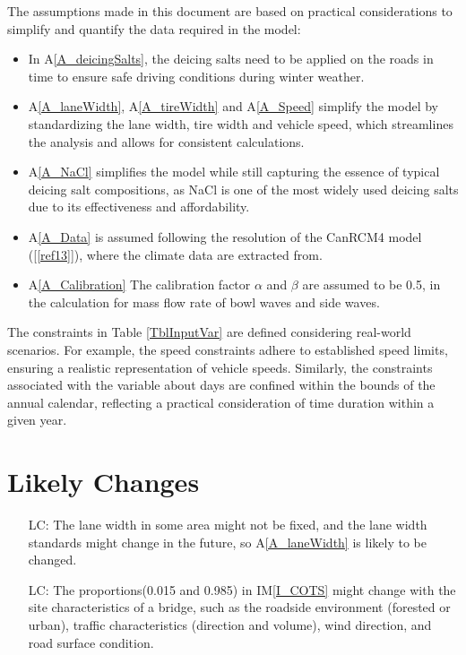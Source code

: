 \documentclass[12pt]{article}
\newcommand{\aref}[1]{A\ref{#1}}
\newcommand{\iref}[1]{IM\ref{#1}}
\newcounter{lcnum} %
\newcommand{\reref}[1]{\ref{#1}}
\begin{document}
The assumptions made in this document are based on practical considerations to simplify and quantify the data required in the model:
\begin{itemize} 
\item In \aref{A_deicingSalts}, the deicing salts need to be applied on the roads in time to ensure safe driving conditions during winter weather. 
\item \aref{A_laneWidth}, \aref{A_tireWidth} and \aref{A_Speed} simplify the model by standardizing the lane width, tire width and vehicle speed, which streamlines the analysis and allows for consistent calculations.
\item \aref{A_NaCl} simplifies the model while still capturing the essence of typical deicing salt compositions, as NaCl is one of the most widely used deicing salts due to its effectiveness and affordability.
\item \aref{A_Data} is assumed following the resolution of the CanRCM4 model ([\reref{ref13}]), where the climate data are extracted from.
\item \aref{A_Calibration} The calibration factor $\alpha$ and $\beta$ are assumed to be 0.5, in the calculation for mass flow rate of bowl waves and side waves.

\end{itemize}

The constraints in Table \ref{TblInputVar} are defined considering real-world scenarios. For example,  the speed constraints adhere to established speed limits, ensuring a realistic representation of vehicle speeds. Similarly, the constraints associated with the variable about days are confined within the bounds of the annual calendar, reflecting a practical consideration of time duration within a given year.


\section{Likely Changes}    

\noindent \begin{itemize}

\item[LC\refstepcounter{lcnum}\thelcnum\label{LC_laneWidth}:] The lane width in some area might not be fixed, and the lane width standards might change in the future, so \aref{A_laneWidth} is likely to be changed. 
\item[LC\refstepcounter{lcnum}\thelcnum\label{LC_SASC}:] The proportions(0.015 and 0.985) in \iref{I_COTS} might change with the site characteristics of a bridge, such as the roadside environment (forested or urban), traffic characteristics (direction and volume), wind direction, and road surface condition. 

\end{itemize}
\end{document}

